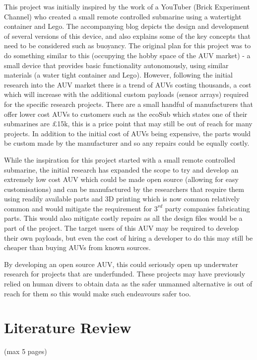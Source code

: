 \documentclass[11pt,a4paper,titlepage]{report}
\begin{document}
	This project was initially inspired by the work of a YouTuber (Brick Experiment Channel\cite{BRICK_EXPERIMENT_CHANNEL_PROFILE}) who created a small remote controlled submarine using a watertight container and Lego. The accompanying blog\cite{BRICK_EXPERIMENT_CHANNEL_BLOG} depicts the design and development of several versions of this device, and also explains some of the key concepts that need to be considered such as buoyancy. The original plan for this project was to do something similar to this (occupying the hobby space of the AUV market) - a small device that provides basic functionality autonomously, using similar materials (a water tight container and Lego). However, following the initial research into the AUV market there is a trend of AUVs costing thousands\cite{AUV_COST}, a cost which will increase with the additional custom payloads (sensor arrays) required for the specific research projects. There are a small handful of manufacturers that offer lower cost AUVs to customers such as the ecoSub\cite{ECOSUB} which states one of their submarines are \unit{\approx}£15k, this is a price point that may still be out of reach for many projects. In addition to the initial cost of AUVs being expensive, the parts would be custom made by the manufacturer and so any repairs could be equally costly. 
	
	While the inspiration for this project started with a small remote controlled submarine, the initial research has expanded the scope to try and develop an extremely low cost AUV which could be made open source (allowing for easy customisations) and can be manufactured by the researchers that require them using readily available parts and 3D printing which is now common relatively common and would mitigate the requirement for $3^{rd}$ party companies fabricating parts. This would also mitigate costly repairs as all the design files would be a part of the project. The target users of this AUV may be required to develop their own payloads, but even the cost of hiring a developer to do this may still be cheaper than buying AUVs from known sources. 
	
	By developing an open source AUV, this could seriously open up underwater research for projects that are underfunded. These projects may have previously relied on human divers to obtain data as the safer unmanned alternative is out of reach for them so this would make such endeavours safer too.  
	
	\chapter*{Literature Review} (max 5 pages)
\end{document}
